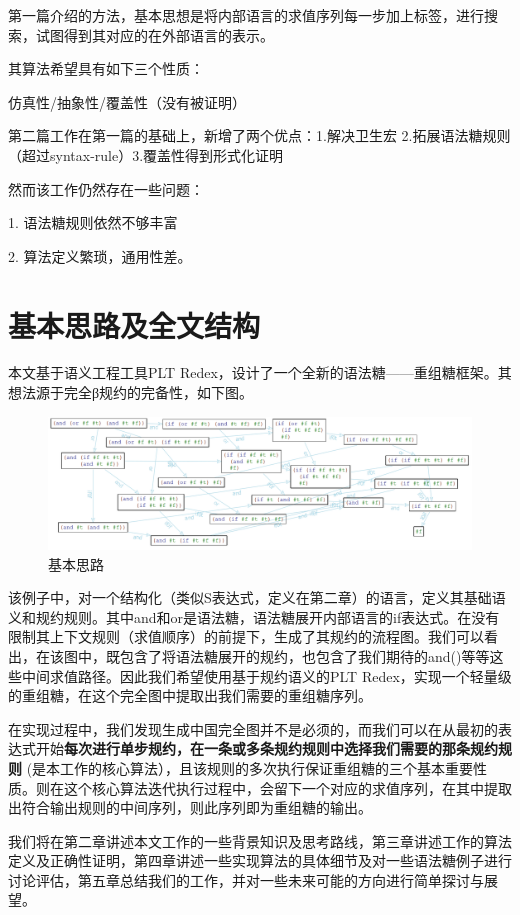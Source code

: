 第一篇介绍的方法，基本思想是将内部语言的求值序列每一步加上标签，进行搜索，试图得到其对应的在外部语言的表示。

其算法希望具有如下三个性质：

仿真性/抽象性/覆盖性（没有被证明）

第二篇工作在第一篇的基础上，新增了两个优点：1.解决卫生宏 2.拓展语法糖规则（超过syntax-rule）3.覆盖性得到形式化证明

然而该工作仍然存在一些问题：

1.	语法糖规则依然不够丰富

2.	算法定义繁琐，通用性差。
\section{基本思路及全文结构}

本文基于语义工程工具PLT Redex，设计了一个全新的语法糖——重组糖框架。其想法源于完全β规约的完备性，如下图。

\begin{figure}[h]
	\centering
	\includegraphics[width=12cm]{images/chapter1/example.png}
	\caption{基本思路}
\end{figure}

该例子中，对一个结构化（类似S表达式，定义在第二章）的语言，定义其基础语义和规约规则。其中and和or是语法糖，语法糖展开内部语言的if表达式。在没有限制其上下文规则（求值顺序）的前提下，生成了其规约的流程图。我们可以看出，在该图中，既包含了将语法糖展开的规约，也包含了我们期待的and()等等这些中间求值路径。因此我们希望使用基于规约语义的PLT Redex，实现一个轻量级的重组糖，在这个完全图中提取出我们需要的重组糖序列。

在实现过程中，我们发现生成中国完全图并不是必须的，而我们可以在从最初的表达式开始{\bfseries 每次进行单步规约，在一条或多条规约规则中选择我们需要的那条规约规则 }(是本工作的核心算法），且该规则的多次执行保证重组糖的三个基本重要性质。则在这个核心算法迭代执行过程中，会留下一个对应的求值序列，在其中提取出符合输出规则的中间序列，则此序列即为重组糖的输出。

我们将在第二章讲述本文工作的一些背景知识及思考路线，第三章讲述工作的算法定义及正确性证明，第四章讲述一些实现算法的具体细节及对一些语法糖例子进行讨论评估，第五章总结我们的工作，并对一些未来可能的方向进行简单探讨与展望。

